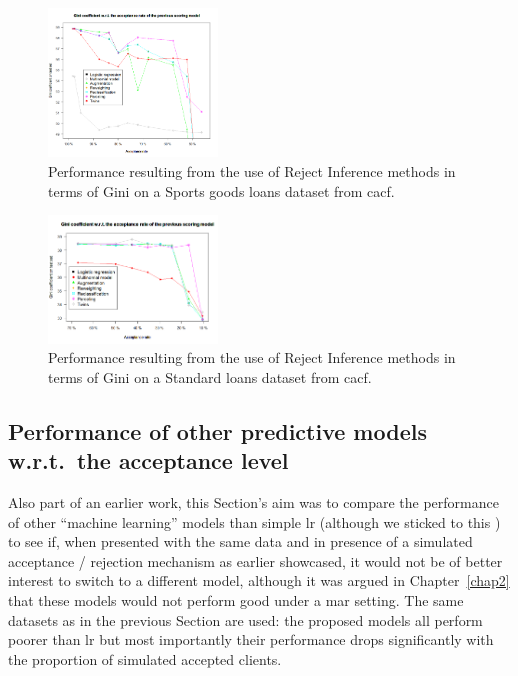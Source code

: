 \begin{figure}[H]
\centering
\includegraphics[width=0.4\textwidth]{figures/appendix/rejectinferencedecathlon.png}
\caption{Performance resulting from the use of Reject Inference methods in terms of Gini on a Sports goods loans dataset from \gls{cacf}.}
\label{fig:decathlon_reject}
\end{figure}

\begin{figure}[H]
\centering
\includegraphics[width=0.4\textwidth]{figures/appendix/rejectinferenceM3.png}
\caption{Performance resulting from the use of Reject Inference methods in terms of Gini on a Standard loans dataset from \gls{cacf}.}
\label{fig:M3_reject}
\end{figure}


\subsection{Performance of other predictive models w.r.t.\ the acceptance level} \label{subsec:app_reject_real}

Also part of an earlier work, this Section's aim was to compare the performance of other ``machine learning'' models than simple \gls{lr} (although we sticked to this ) to see if, when presented with the same data and in presence of a simulated acceptance / rejection mechanism as earlier showcased, it would not be of better interest to switch to a different model, although it was argued in Chapter~\ref{chap2} that these models would not perform good under a \gls{mar} setting. The same datasets as in the previous Section are used: the proposed models all perform poorer than \gls{lr} but most importantly their performance drops significantly with the proportion of simulated accepted clients.

